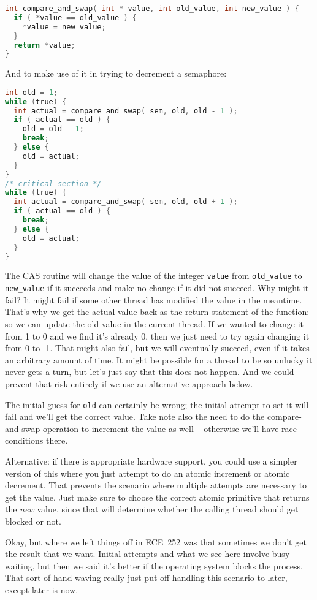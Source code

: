 \begin{lstlisting}[language=C]
int compare_and_swap( int * value, int old_value, int new_value ) {
  if ( *value == old_value ) {
    *value = new_value;
  }
  return *value;
}
\end{lstlisting}

And to make use of it in trying to decrement a semaphore:

\begin{lstlisting}[language=C]
int old = 1;
while (true) {
  int actual = compare_and_swap( sem, old, old - 1 );
  if ( actual == old ) {
    old = old - 1;
    break;
  } else {
    old = actual;
  }
}
/* critical section */
while (true) {
  int actual = compare_and_swap( sem, old, old + 1 );
  if ( actual == old ) {
    break;
  } else {
    old = actual;
  }
}
\end{lstlisting}

The CAS routine will change the value of the integer \texttt{value} from \texttt{old\_value} to \texttt{new\_value} if it succeeds and make no change if it did not succeed. Why might it fail? It might fail if some other thread has modified the value in the meantime. That's why we get the actual value back as the return statement of the function: so we can update the old value in the current thread. If we wanted to change it from 1 to 0 and we find it's already 0, then we just need to try again changing it from 0 to -1. That might also fail, but we will eventually succeed, even if it takes an arbitrary amount of time. It might be possible for a thread to be so unlucky it never gets a turn, but let's just say that this does not happen. And we could prevent that risk entirely if we use an alternative approach below.

The initial guess for \texttt{old} can certainly be wrong; the initial attempt to set it will fail and we'll get the correct value. Take note also the need to do the compare-and-swap operation to increment the value as well -- otherwise we'll have race conditions there.

Alternative: if there is appropriate hardware support, you could use a simpler version of this where you just attempt to do an atomic increment or atomic decrement. That prevents the scenario where multiple attempts are necessary to get the value. Just make sure to choose the correct atomic primitive that returns the \textit{new} value, since that will determine whether the calling thread should get blocked or not.

Okay, but where we left things off in ECE~252 was that sometimes we don't get the result that we want. Initial attempts and what we see here involve busy-waiting, but then we said it's better if the operating system blocks the process. That sort of hand-waving really just put off handling this scenario to later, except later is now.

